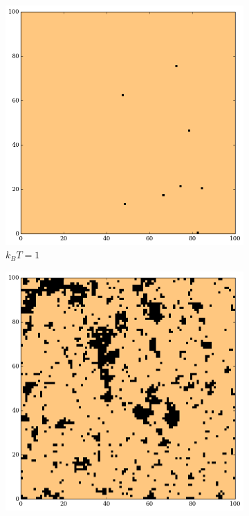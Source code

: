 \documentclass{scrartcl}
\begin{document}
\begin{figure}[H]
    \centering
    \begin{subfigure}{.32\textwidth}
        \includegraphics[width=\textwidth]{plots/sc_u_1.png}
        \caption{$k_BT = 1$}
    \end{subfigure}%
    \begin{subfigure}{.32\textwidth}
        \includegraphics[width=\textwidth]{plots/sc_u_2_25.png}

\end{subfigure}
\end{figure}
\end{document}
